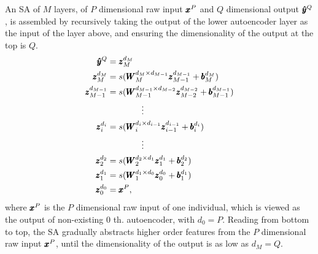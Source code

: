 An SA of $M$ layers, of $P$ dimensional raw input $\pmb{x}^P$ and $Q$ dimensional output $\pmb{\hat{y}}^Q$, is assembled by recursively taking the output of the lower autoencoder layer as the input of the layer above, and ensuring the dimensionality of the output at the top is $Q$.
\begin{equation} \label{eq:ES}
  \begin{split}
    \pmb{\hat{y}}^Q &= {\pmb{z}_{M}^{d_{M}}} \\
    {\pmb{z}_{M  }^{d_{M  }}} &= s(\pmb{W}_{M  }^{d_{M  } \times d_{M-1}} {\pmb{z}_{M-1}^{d_{M-1}}} + \pmb{b}_{M  }^{d_{M  }}) \\
    {\pmb{z}_{M-1}^{d_{M-1}}} &= s(\pmb{W}_{M-1}^{d_{M-1} \times d_{M-2}} {\pmb{z}_{M-2}^{d_{M-2}}} + \pmb{b}_{M-1}^{d_{M-1}}) \\
    & \quad \quad \quad \quad \vdots \\
    {\pmb{z}_{i  }^{d_{i  }}} &= s(\pmb{W}_{i  }^{d_{i  } \times d_{i-1}} {\pmb{z}_{i-1}^{d_{i-1}}} + \pmb{b}_{i  }^{d_{i  }}) \\
    & \quad \quad \quad \quad \vdots \\
    {\pmb{z}_{2  }^{d_{2  }}} &= s(\pmb{W}_{2  }^{d_{2  } \times d_{1  }} {\pmb{z}_{1  }^{d_{1  }}} + \pmb{b}_{2  }^{d_{2  }}) \\
    {\pmb{z}_{1  }^{d_{1  }}} &= s(\pmb{W}_{1  }^{d_{1  } \times d_{0  }} {\pmb{z}_{0  }^{d_{0  }}} + \pmb{b}_{1  }^{d_{1  }}) \\
    {\pmb{z}_{0  }^{d_{0  }}} &= \pmb{x}^P,
  \end{split}
\end{equation}
where $\pmb{x}^P$ is the $P$ dimensional raw input of one individual, which is viewed as the output of non-existing $0$ th. autoencoder, with $d_0=P$. Reading from bottom to top, the SA gradually abstracts higher order features from the $P$ dimensional raw input $\pmb{x}^P$, until the dimensionality of the output is as low as $d_M=Q$.

